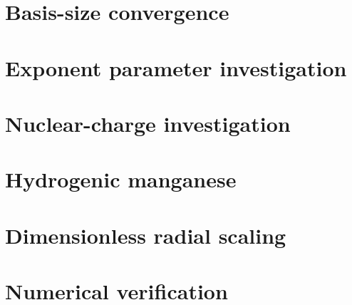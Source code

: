 \section{Basis-size convergence}


\section{Exponent parameter investigation}

\section{Nuclear-charge investigation}


\section{Hydrogenic manganese}

\section{Dimensionless radial scaling}


\section{Numerical verification}

